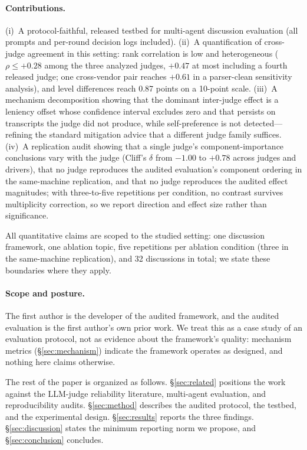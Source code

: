 \paragraph{Contributions.}
(i)~A protocol-faithful, released testbed for multi-agent discussion
evaluation (all prompts and per-round decision logs included).
(ii)~A quantification of cross-judge agreement in this setting: rank
correlation is low and heterogeneous ($\rho\leq+0.28$ among the three
analyzed judges, $+0.47$ at most including a fourth released judge; one
cross-vendor pair reaches $+0.61$ in a parser-clean sensitivity
analysis), and level differences reach 0.87 points on a 10-point
scale.
(iii)~A mechanism decomposition showing that the dominant inter-judge
effect is a leniency offset whose confidence interval excludes zero and
that persists on transcripts the judge did not produce, while
self-preference is not detected---refining the standard mitigation
advice that a different judge family suffices.
(iv)~A replication audit showing that a single judge's
component-importance conclusions vary with the judge (Cliff's $\delta$
from $-1.00$ to $+0.78$ across judges and drivers), that no judge
reproduces the audited evaluation's component ordering in the
same-machine replication, and that no judge reproduces the audited
effect magnitudes; with three-to-five repetitions per condition, no
contrast survives multiplicity correction, so we report direction and
effect size rather than significance.

All quantitative claims are scoped to the studied setting: one
discussion framework, one ablation topic, five repetitions per ablation
condition (three in the same-machine replication), and 32 discussions
in total; we state these boundaries where they apply.

\paragraph{Scope and posture.} The first author is the developer of the
audited framework, and the audited evaluation is the first author's own
prior work. We treat this as a case study of an evaluation protocol,
not as evidence about the framework's quality: mechanism metrics
(\S\ref{sec:mechanism}) indicate the framework operates as designed, and
nothing here claims otherwise.

The rest of the paper is organized as follows. \S\ref{sec:related}
positions the work against the LLM-judge reliability literature,
multi-agent evaluation, and reproducibility audits. \S\ref{sec:method}
describes the audited protocol, the testbed, and the experimental
design. \S\ref{sec:results} reports the three findings.
\S\ref{sec:discussion} states the minimum reporting norm we propose,
and \S\ref{sec:conclusion} concludes.
